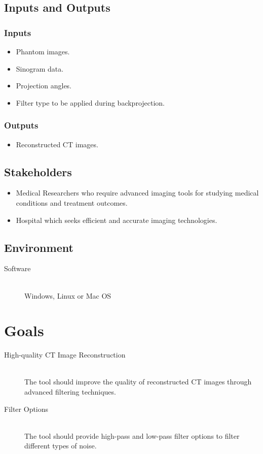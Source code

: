 \documentclass{article}
\begin{document}
\subsection{Inputs and Outputs}
\subsubsection{Inputs}
\begin{itemize}
\item Phantom images.
\item Sinogram data.
\item Projection angles.
\item Filter type to be applied during backprojection.
\end{itemize}

\subsubsection{Outputs}
\begin{itemize}
  \item Reconstructed CT images.
\end{itemize}

\subsection{Stakeholders}
\begin{itemize}
\item Medical Researchers who require advanced imaging tools for studying
  medical conditions and treatment outcomes.
\item Hospital which seeks efficient and accurate imaging technologies.
\end{itemize}

\subsection{Environment}
\begin{description}
\item[Software] \hfill \\ Windows, Linux or Mac OS
\end{description}

\section{Goals}
\begin{description}
\item[High-quality CT Image Reconstruction] \hfill \\ The tool should improve
  the quality of reconstructed CT images through advanced filtering techniques.
\item[Filter Options] \hfill \\ The tool should provide high-pass and
  low-pass filter options to filter different types of noise.
\end{description}
\end{document}
